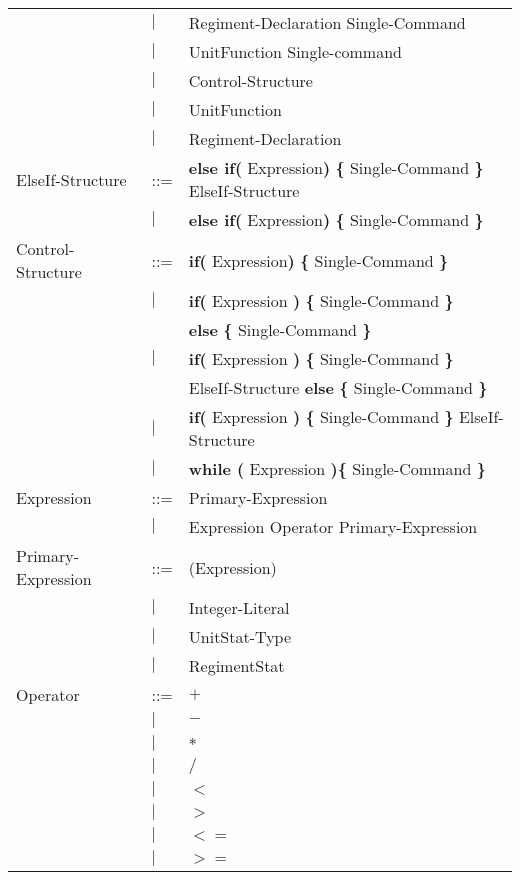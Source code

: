 \begin{center}
\begin{longtable}{l l l}
							&$\mid$	&Regiment-Declaration Single-Command\\
							&$\mid$	&UnitFunction Single-command\\
							&$\mid$	&Control-Structure\\
							&$\mid$	&UnitFunction\\
							&$\mid$	&Regiment-Declaration\\
ElseIf-Structure			&	::=	&{\bf else if( } Expression{\bf )} {\bf \{ } Single-Command {\bf \} } ElseIf-Structure\\
							&$\mid$	&{\bf else if( } Expression{\bf )} {\bf \{ } Single-Command {\bf \} } \\
Control-Structure			&	::=	&{\bf if( } Expression{\bf )} {\bf \{ } Single-Command {\bf \} }  \\
							&$\mid$	&{\bf if(} Expression {\bf )} {\bf \{ }Single-Command {\bf \}} \\
							&		&{\bf else } {\bf \{ }Single-Command {\bf \} } \\			
							&$\mid$	&{\bf if(} Expression {\bf )} {\bf \{ }Single-Command {\bf \}} \\
							&		&ElseIf-Structure {\bf else } {\bf \{ }Single-Command {\bf \} } \\
							&$\mid$	&{\bf if(} Expression {\bf )} {\bf \{ }Single-Command {\bf \}} ElseIf-Structure \\	
							&$\mid$	&{\bf while (} Expression {\bf )}{\bf \{ } Single-Command {\bf \}} \\
Expression					&	::=	&Primary-Expression \\
							&$\mid$	&Expression Operator Primary-Expression \\
Primary-Expression			&	::=	&(Expression)\\
							&$\mid$	&Integer-Literal \\
							&$\mid$	&UnitStat-Type \\
							&$\mid$	&RegimentStat \\
Operator					&	::=	&$\boldsymbol {+}$\\
							&$\mid$	&$\boldsymbol {-}$\\
							&$\mid$	&$\boldsymbol {*}$\\
							&$\mid$	&$\boldsymbol {/}$\\
							&$\mid$	&$\boldsymbol {<}$\\
							&$\mid$	&$\boldsymbol {>}$\\
							&$\mid$	&$\boldsymbol {<=}$\\
							&$\mid$	&$\boldsymbol {>=}$\\

\end{longtable}
\end{center}
